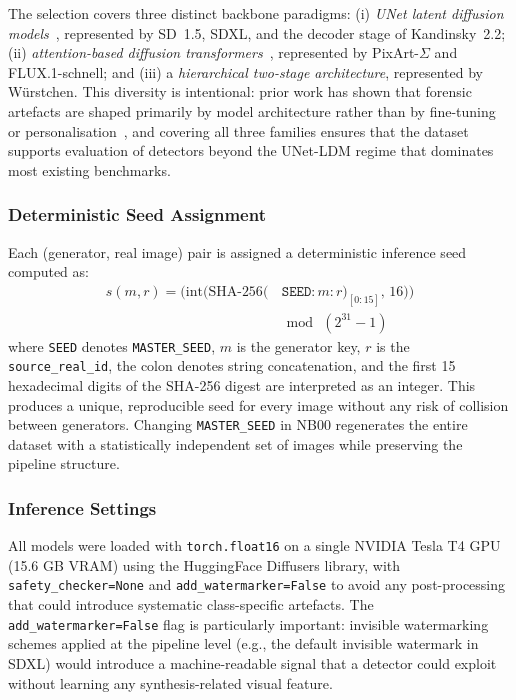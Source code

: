The selection covers three distinct backbone paradigms: (i) \emph{UNet
latent diffusion models}~\cite{rombach2022ldm}, represented by SD~1.5,
SDXL, and the decoder stage of Kandinsky~2.2; (ii) \emph{attention-based
diffusion transformers}~\cite{chen2024pixart}, represented by
PixArt-$\Sigma$ and FLUX.1-schnell; and (iii) a \emph{hierarchical
two-stage architecture}, represented by W\"{u}rstchen.
This diversity is intentional: prior work has shown that forensic
artefacts are shaped primarily by model architecture rather than by
fine-tuning or personalisation~\cite{hong2024wildfake}, and covering all
three families ensures that the dataset supports evaluation of detectors
beyond the UNet-LDM regime that dominates most existing benchmarks.

\subsubsection{Deterministic Seed Assignment}

Each (generator, real image) pair is assigned a deterministic inference
seed computed as:
\begin{equation}
\begin{split}
s(m, r) = \big(\mathrm{int}(\mathrm{SHA\text{-}256}(
          &\,\texttt{SEED} : m : r)_{[0:15]},\, 16)\big) \\
          &\bmod\, (2^{31} - 1)
\end{split}
\label{eq:seed}
\end{equation}
where \texttt{SEED} denotes \texttt{MASTER\_SEED}, $m$ is the generator
key, $r$ is the \texttt{source\_real\_id}, the colon denotes string
concatenation, and the first 15 hexadecimal digits of the SHA-256
digest are interpreted as an integer.
This produces a unique, reproducible seed for every image without any
risk of collision between generators.
Changing \texttt{MASTER\_SEED} in NB00 regenerates the entire dataset
with a statistically independent set of images while preserving the
pipeline structure.

\subsubsection{Inference Settings}

All models were loaded with \texttt{torch.float16} on a single NVIDIA
Tesla T4 GPU (15.6 GB VRAM) using the HuggingFace Diffusers library,
with \texttt{safety\_checker=None} and \texttt{add\_watermarker=False}
to avoid any post-processing that could introduce systematic
class-specific artefacts.
The \texttt{add\_watermarker=False} flag is particularly important:
invisible watermarking schemes applied at the pipeline level (e.g.,
the default invisible watermark in SDXL) would introduce a machine-readable
signal that a detector could exploit without learning any synthesis-related
visual feature.

